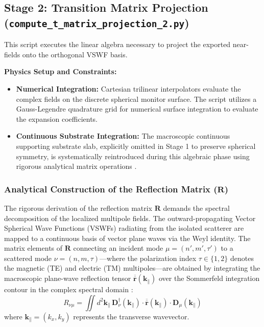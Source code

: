 \documentclass[11pt,a4paper]{article}
\begin{document}
\subsection{Stage 2: Transition Matrix Projection (\texttt{compute\_t\_matrix\_projection\_2.py})}
This script executes the linear algebra necessary to project the exported near-fields onto the orthogonal VSWF basis.

\textbf{Physics Setup and Constraints:}
\begin{itemize}
    \item \textbf{Numerical Integration:} Cartesian trilinear interpolators evaluate the complex fields on the discrete spherical monitor surface. The script utilizes a Gauss-Legendre quadrature grid for numerical surface integration to evaluate the expansion coefficients.
    \item \textbf{Continuous Substrate Integration:} The macroscopic continuous supporting substrate slab, explicitly omitted in Stage 1 to preserve spherical symmetry, is systematically reintroduced during this algebraic phase using rigorous analytical matrix operations \cite{tsang2001scattering}. 
\end{itemize}

\subsubsection*{Analytical Construction of the Reflection Matrix ($\mathbf{R}$)}
The rigorous derivation of the reflection matrix $\mathbf{R}$ demands the spectral decomposition of the localized multipole fields. The outward-propagating Vector Spherical Wave Functions (VSWFs) radiating from the isolated scatterer are mapped to a continuous basis of vector plane waves via the Weyl identity. The matrix elements of $\mathbf{R}$ connecting an incident mode $\mu = (n', m', \tau')$ to a scattered mode $\nu = (n, m, \tau)$---where the polarization index $\tau \in \{1, 2\}$ denotes the magnetic (TE) and electric (TM) multipoles---are obtained by integrating the macroscopic plane-wave reflection tensor $\overline{\overline{\mathbf{r}}}(\mathbf{k}_{\parallel})$ over the Sommerfeld integration contour in the complex spectral domain \cite{tsang2001scattering}:
\begin{equation}
    R_{\nu \mu} = \iint d^2\mathbf{k}_{\parallel} \, \mathbf{D}_{\nu}^{\dagger}(\mathbf{k}_{\parallel}) \cdot \overline{\overline{\mathbf{r}}}(\mathbf{k}_{\parallel}) \cdot \mathbf{D}_{\mu}(\mathbf{k}_{\parallel})
\end{equation}
where $\mathbf{k}_{\parallel} = (k_x, k_y)$ represents the transverse wavevector.
\end{document}

